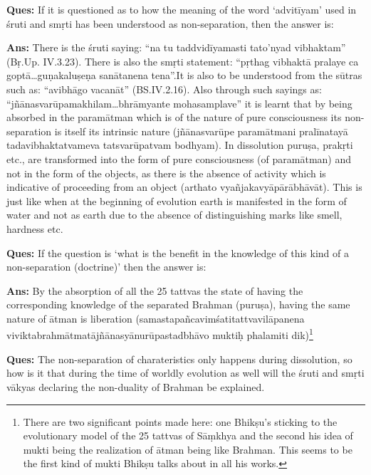 \textbf{Ques:} If it is questioned as to how the meaning of the word ‘advitīyam’ used in śruti and smṛti has been understood as non-separation, then the answer is: 

\textbf{Ans:} There is the śruti saying: “na tu taddvidīyamasti tato’nyad vibhaktam” (Bṛ.Up. IV.3.23). There is also the smṛti statement: “pṛthag vibhaktā pralaye ca goptā…guṇakaluṣeṇa sanātanena tena”.It is also to be understood from the sūtras such as: “avibhāgo vacanāt” (BS.IV.2.16). Also through such sayings as: “jñānasvarūpamakhilam…bhrāmyante mohasamplave” it is learnt that by being absorbed in the paramātman which is of the nature of pure consciousness its non-separation is itself its intrinsic nature (jñānasvarūpe paramātmani pralīnatayā tadavibhaktatvameva tatsvarūpatvam bodhyam). In dissolution puruṣa, prakṛti etc., are transformed into the form of pure consciousness (of paramātman) and not in the form of the objects, as there is the absence of activity which is indicative of proceeding from an object (arthato vyañjakavyāpārābhāvāt). This is just like when at the beginning of evolution earth is manifested in the form of water and not as earth due to the absence of distinguishing marks like smell, hardness etc. 

\textbf{Ques:} If the question is ‘what is the benefit in the knowledge of this kind of a non-separation (doctrine)’ then the answer is: 

\textbf{Ans:} By the absorption of all the 25 tattvas the state of having the corresponding knowledge of the separated Brahman (puruṣa), having the same nature of ātman is liberation (samastapañcavimśatitattvavilāpanena viviktabrahmātmatājñānasyānurūpastadbhāvo muktiḥ phalamiti dik)\footnote{There are two significant points made here: one Bhikṣu’s sticking to the evolutionary model of the 25 tattvas of Sāṃkhya and the second his idea of mukti being the realization of ātman being like Brahman. This seems to be the first kind of mukti Bhikṣu talks about in all his works.}

\textbf{Ques:} The non-separation of charateristics only happens during dissolution, so how is it that during the time of worldly evolution as well will the śruti and smṛti vākyas declaring the non-duality of Brahman be explained. 

